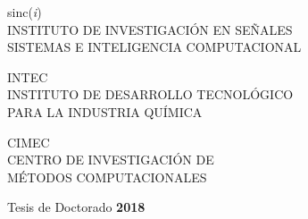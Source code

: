 \noindent \textrm{sinc(\textit{i})}\\
\noindent \textrm{\small INSTITUTO DE INVESTIGACIÓN EN SEÑALES}\\
\noindent \textrm{\small SISTEMAS E INTELIGENCIA COMPUTACIONAL}
\vspace{0.4cm}

\noindent \textrm{INTEC}\\
\noindent \textrm{\small INSTITUTO DE DESARROLLO TECNOLÓGICO}\\
\noindent \textrm{\small PARA LA INDUSTRIA QUÍMICA}
\vspace{0.4cm}

\noindent \textrm{CIMEC}\\
\noindent \textrm{\small CENTRO DE INVESTIGACIÓN DE}\\
\noindent \textrm{\small MÉTODOS COMPUTACIONALES}


\vspace{1cm}

\begin{flushright}
	\noindent \large{Tesis de Doctorado \textbf{2018}}
\end{flushright}

